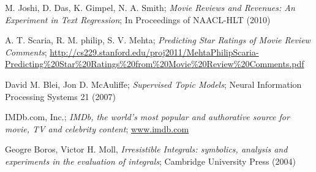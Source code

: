\documentclass[a4paper,10pt]{article}
\begin{document}
\begin{thebibliography}{9}
	M. Joshi, D. Das, K. Gimpel, N. A. Smith;
	\emph{Movie Reviews and Revenues: An Experiment in Text Regression};
	In Proceedings of NAACL-HLT (2010)

	A. T. Scaria, R. M. philip, S. V. Mehta;
	\emph{Predicting Star Ratings of Movie Review Comments};
	\url{http://cs229.stanford.edu/proj2011/MehtaPhilipScaria-Predicting\%20Star\%20Ratings\%20from\%20Movie\%20Review\%20Comments.pdf}

	David M. Blei, Jon D. McAuliffe;
	\emph{Supervised Topic Models};
	Neural Information Processing Systems 21 (2007)
  
	IMDb.com, Inc.; 
	\emph{IMDb, the world's most popular and authorative source for movie, TV and celebrity content};
	\url{www.imdb.com}

	Geogre Boros, Victor H. Moll,
	\emph{Irresistible Integrals: symbolics, analysis and experiments in the evaluation of integrals};
	Cambridge University Press (2004)

\end{thebibliography}
\end{document}
